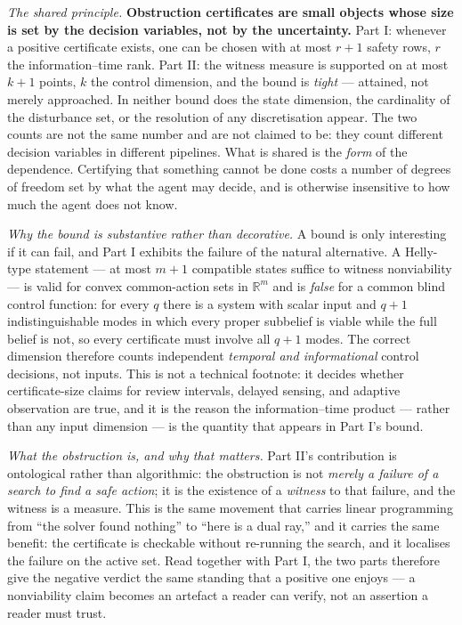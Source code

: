 \documentclass[10pt,twocolumn]{article}
\theoremstyle{plain}
\theoremstyle{definition}
\theoremstyle{remark}
\begin{document}
\emph{The shared principle.} \textbf{Obstruction certificates are small objects whose size is set
by the decision variables, not by the uncertainty.} Part I: whenever a positive certificate exists,
one can be chosen with at most $r+1$ safety rows, $r$ the information--time rank. Part II: the
witness measure is supported on at most $k+1$ points, $k$ the control dimension, and the bound is
\emph{tight} --- attained, not merely approached. In neither bound does the state dimension, the
cardinality of the disturbance set, or the resolution of any discretisation appear. The two counts
are not the same number and are not claimed to be: they count different decision variables in
different pipelines. What is shared is the \emph{form} of the dependence. Certifying that something
cannot be done costs a number of degrees of freedom set by what the agent may decide, and is
otherwise insensitive to how much the agent does not know.

\emph{Why the bound is substantive rather than decorative.} A bound is only interesting if it can
fail, and Part I exhibits the failure of the natural alternative. A Helly-type statement --- at most
$m+1$ compatible states suffice to witness nonviability --- is valid for convex common-action sets
in $\mathbb{R}^m$ and is \emph{false} for a common blind control function: for every $q$ there is a
system with scalar input and $q+1$ indistinguishable modes in which every proper subbelief is
viable while the full belief is not, so every certificate must involve all $q+1$ modes. The
correct dimension therefore counts independent \emph{temporal and informational} control decisions,
not inputs. This is not a technical footnote: it decides whether certificate-size claims for
review intervals, delayed sensing, and adaptive observation are true, and it is the reason the
information--time product --- rather than any input dimension --- is the quantity that appears in
Part I's bound.

\emph{What the obstruction is, and why that matters.} Part II's contribution is ontological rather
than algorithmic: the obstruction is not \emph{merely a failure of a search to find a safe action};
it is the existence of a \emph{witness} to that failure, and the witness is a measure. This is the
same movement that carries linear programming from ``the solver found nothing'' to ``here is a dual
ray,'' and it carries the same benefit: the certificate is checkable without re-running the search,
and it localises the failure on the active set. Read together with Part I, the two parts therefore
give the negative verdict the same standing that a positive one enjoys --- a nonviability claim
becomes an artefact a reader can verify, not an assertion a reader must trust.
\end{document}

